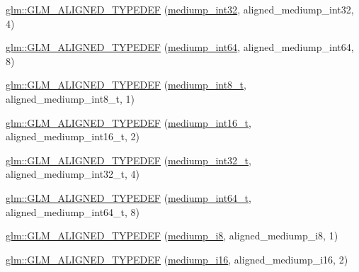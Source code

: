 \begin{DoxyCompactItemize}
\hyperlink{group__gtx__type__aligned_ga0680cd3b5d4e8006985fb41a4f9b57af}{glm\+::\+G\+L\+M\+\_\+\+A\+L\+I\+G\+N\+E\+D\+\_\+\+T\+Y\+P\+E\+D\+EF} (\hyperlink{group__gtc__type__precision_ga0660a752402702f420f13c686a7fff29}{mediump\+\_\+int32}, aligned\+\_\+mediump\+\_\+int32, 4)
\item 
\hyperlink{group__gtx__type__aligned_gad9e5babb1dd3e3531b42c37bf25dd951}{glm\+::\+G\+L\+M\+\_\+\+A\+L\+I\+G\+N\+E\+D\+\_\+\+T\+Y\+P\+E\+D\+EF} (\hyperlink{group__gtc__type__precision_ga603c695fe5cd677d3f72a81343e19a74}{mediump\+\_\+int64}, aligned\+\_\+mediump\+\_\+int64, 8)
\item 
\hyperlink{group__gtx__type__aligned_ga353fd9fa8a9ad952fcabd0d53ad9a6dd}{glm\+::\+G\+L\+M\+\_\+\+A\+L\+I\+G\+N\+E\+D\+\_\+\+T\+Y\+P\+E\+D\+EF} (\hyperlink{group__gtc__type__precision_ga626ac5f73d3538e62a879d6c56abfb36}{mediump\+\_\+int8\+\_\+t}, aligned\+\_\+mediump\+\_\+int8\+\_\+t, 1)
\item 
\hyperlink{group__gtx__type__aligned_ga2196442c0e5c5e8c77842de388c42521}{glm\+::\+G\+L\+M\+\_\+\+A\+L\+I\+G\+N\+E\+D\+\_\+\+T\+Y\+P\+E\+D\+EF} (\hyperlink{group__gtc__type__precision_ga478fab608cf43040013d719a3e03b194}{mediump\+\_\+int16\+\_\+t}, aligned\+\_\+mediump\+\_\+int16\+\_\+t, 2)
\item 
\hyperlink{group__gtx__type__aligned_ga1284488189daf897cf095c5eefad9744}{glm\+::\+G\+L\+M\+\_\+\+A\+L\+I\+G\+N\+E\+D\+\_\+\+T\+Y\+P\+E\+D\+EF} (\hyperlink{group__gtc__type__precision_gafd9b4bd9e4465aec63351b59100692c4}{mediump\+\_\+int32\+\_\+t}, aligned\+\_\+mediump\+\_\+int32\+\_\+t, 4)
\item 
\hyperlink{group__gtx__type__aligned_ga73fdc86a539808af58808b7c60a1c4d8}{glm\+::\+G\+L\+M\+\_\+\+A\+L\+I\+G\+N\+E\+D\+\_\+\+T\+Y\+P\+E\+D\+EF} (\hyperlink{group__gtc__type__precision_ga555a2f85641550c232db473a9bb981f7}{mediump\+\_\+int64\+\_\+t}, aligned\+\_\+mediump\+\_\+int64\+\_\+t, 8)
\item 
\hyperlink{group__gtx__type__aligned_gafafeea923e1983262c972e2b83922d3b}{glm\+::\+G\+L\+M\+\_\+\+A\+L\+I\+G\+N\+E\+D\+\_\+\+T\+Y\+P\+E\+D\+EF} (\hyperlink{group__gtc__type__precision_ga28a8b5fd51072680bb55178c17cc7411}{mediump\+\_\+i8}, aligned\+\_\+mediump\+\_\+i8, 1)
\item 
\hyperlink{group__gtx__type__aligned_ga4b35ca5fe8f55c9d2fe54fdb8d8896f4}{glm\+::\+G\+L\+M\+\_\+\+A\+L\+I\+G\+N\+E\+D\+\_\+\+T\+Y\+P\+E\+D\+EF} (\hyperlink{group__gtc__type__precision_ga8454fc6a82c7bb787d0ac9663e08f63d}{mediump\+\_\+i16}, aligned\+\_\+mediump\+\_\+i16, 2)
\item 

\end{DoxyCompactItemize}
